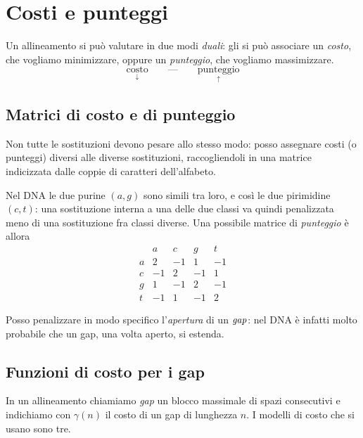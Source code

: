 \section{Costi e punteggi}

%
Un allineamento si può valutare in due modi \emph{duali}: gli si può associare
un \emph{costo}, che vogliamo minimizzare, oppure un \emph{punteggio}, che
vogliamo massimizzare.
\[
  \underset{\displaystyle\downarrow}{\text{costo}}
  \qquad\text{---}\qquad
  \underset{\displaystyle\uparrow}{\text{punteggio}}
\]

\subsection{Matrici di costo e di punteggio}

Non tutte le sostituzioni devono pesare allo stesso modo: posso assegnare costi
(o punteggi) diversi alle diverse sostituzioni, raccogliendoli in una matrice
indicizzata dalle coppie di caratteri dell'alfabeto.

\begin{esempio}
  Nel DNA le due purine $(a,g)$ sono simili tra loro, e così le due pirimidine
  $(c,t)$: una sostituzione interna a una delle due classi va quindi penalizzata
  meno di una sostituzione fra classi diverse. Una possibile matrice di
  \emph{punteggio} è allora
  \[
    \begin{array}{c|rrrr}
         &  a &  c &  g &  t \\ \hline
       a &  2 & -1 &  1 & -1 \\
       c & -1 &  2 & -1 &  1 \\
       g &  1 & -1 &  2 & -1 \\
       t & -1 &  1 & -1 &  2
    \end{array}
  \]
\end{esempio}

\begin{esempio}
  Posso penalizzare in modo specifico l'\emph{apertura} di un $\mathit{gap}$: nel DNA è
  infatti molto probabile che un gap, una volta aperto, si estenda.
\end{esempio}

\subsection{Funzioni di costo per i gap}

%
In un allineamento chiamiamo \emph{gap} un blocco massimale di spazi
consecutivi e indichiamo con $\gamma(n)$ il costo di un gap di lunghezza $n$.
I modelli di costo che si usano sono tre.

